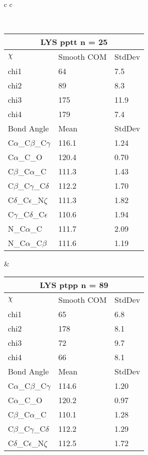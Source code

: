 \newpage

\begin{longtable}{ c c }

\caption{LYS Central Values}\\
  \begin{tabular}{ l l l }
  \toprule
  \multicolumn{3}{c}{LYS \textbf{pptt} n = 25} \\ \toprule
  $\chi$       & Smooth COM & StdDev \\ \midrule
  chi1 & 64 & 7.5 \\ 
  chi2 & 89 & 8.3 \\ 
  chi3 & 175 & 11.9 \\ 
  chi4 & 179 & 7.4 \\ \midrule
  Bond Angle   & Mean     & StdDev \\ \midrule
  C$\alpha$\_C$\beta$\_C$\gamma$ & 116.1 & 1.24\\
  C$\alpha$\_C\_O & 120.4 & 0.70\\
  C$\beta$\_C$\alpha$\_C & 111.3 & 1.43\\
  C$\beta$\_C$\gamma$\_C$\delta$ & 112.2 & 1.70\\
  C$\delta$\_C$\epsilon$\_N$\zeta$ & 111.3 & 1.82\\
  C$\gamma$\_C$\delta$\_C$\epsilon$ & 110.6 & 1.94\\
  N\_C$\alpha$\_C & 111.7 & 2.09\\
  N\_C$\alpha$\_C$\beta$ & 111.6 & 1.19\\
  \bottomrule
  \end{tabular}
  &
  \begin{tabular}{ l l l }
  \toprule
  \multicolumn{3}{c}{LYS \textbf{ptpp} n = 89} \\ \toprule
  $\chi$       & Smooth COM & StdDev \\ \midrule
  chi1 & 65 & 6.8 \\ 
  chi2 & 178 & 8.1 \\ 
  chi3 & 72 & 9.7 \\ 
  chi4 & 66 & 8.1 \\ \midrule
  Bond Angle   & Mean     & StdDev \\ \midrule
  C$\alpha$\_C$\beta$\_C$\gamma$ & 114.6 & 1.20\\
  C$\alpha$\_C\_O & 120.2 & 0.97\\
  C$\beta$\_C$\alpha$\_C & 110.1 & 1.28\\
  C$\beta$\_C$\gamma$\_C$\delta$ & 112.2 & 1.29\\
  C$\delta$\_C$\epsilon$\_N$\zeta$ & 112.5 & 1.72\\

\end{tabular}
\end{longtable}
